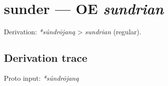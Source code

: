 \documentclass[
  british,
  a4paper,
  openany]{book}
\providecommand{\texorpdfstring}[2]{#1}
\begin{document}
\section{\texorpdfstring{sunder --- OE
\emph{sundrian}}{sunder --- OE sundrian}}\label{sunder-oe-sundrian}


Derivation: \emph{*súndrōjaną} \textgreater{} \emph{sundrian} (regular).

\subsection{Derivation trace}\label{derivation-trace-52}

Proto input: \emph{*súndrōjaną}

\begingroup
\setlength{\fboxsep}{6pt}
\end{document}
